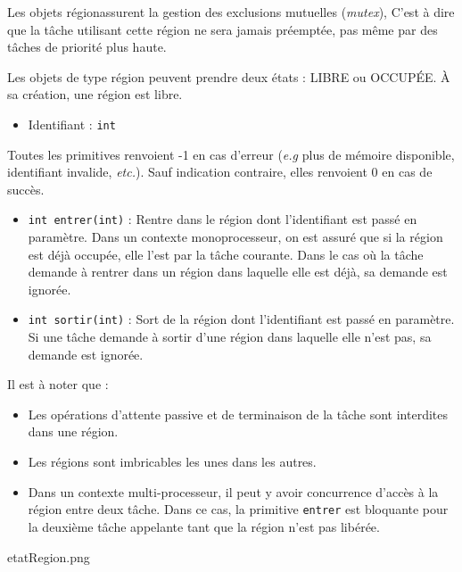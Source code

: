 {
Les objets \og région\fg assurent la gestion des exclusions mutuelles (\textsl{mutex}), C'est à dire que la tâche utilisant cette région ne sera jamais préemptée, pas même par des tâches de priorité plus haute.

Les objets de type région peuvent prendre deux états : LIBRE ou OCCUPÉE. À sa création, une région est libre.
}
{
\begin{itemize}
	\item Identifiant : \texttt{int}
\end{itemize}
}
{
Toutes les primitives renvoient -1 en cas d'erreur (\textsl{e.g} plus de mémoire disponible, identifiant invalide, \textsl{etc.}). Sauf indication contraire, elles renvoient 0 en cas de succès.

\begin{itemize}
	\item \texttt{int entrer(int)} : Rentre dans le région dont l'identifiant est passé en paramètre. Dans un contexte monoprocesseur, on est assuré que si la région est déjà occupée, elle l'est par la tâche courante. Dans le cas où la tâche demande à rentrer dans un région dans laquelle elle est déjà, sa demande est ignorée.
	\item \texttt{int sortir(int)} : Sort de la région dont l'identifiant est passé en paramètre. Si une tâche demande à sortir d'une région dans laquelle elle n'est pas, sa demande est ignorée.
\end{itemize}
}
{
Il est à noter que :
\begin{itemize}
	\item Les opérations d'attente passive et de terminaison de la tâche sont interdites dans une région.
	\item Les régions sont imbricables les unes dans les autres.
	\item Dans un contexte multi-processeur, il peut y avoir concurrence d'accès à la région entre deux tâche. Dans ce cas, la primitive \texttt{entrer} est bloquante pour la deuxième tâche appelante tant que la région n'est pas libérée.
\end{itemize}
}
{etatRegion.png}
